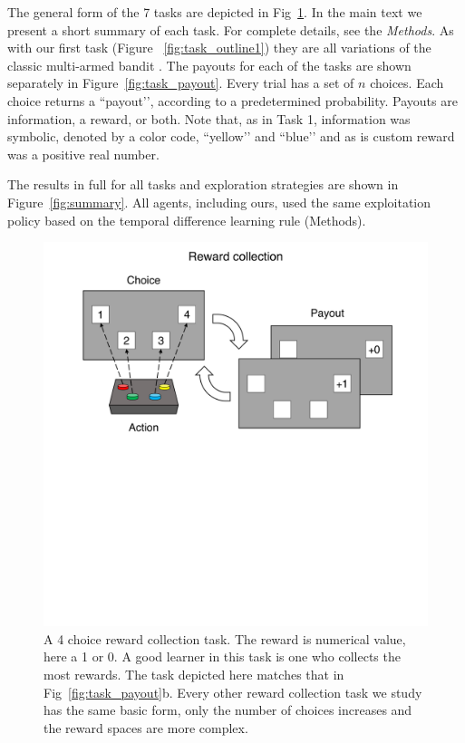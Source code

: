 The general form of the 7 tasks are depicted in Fig~\ref{fig:task_outline2}. In the main text we present a short summary of each task. For complete details, see the \emph{Methods}. As with our first task (Figure ~\ref{fig:task_outline1}) they are all variations of the classic multi-armed bandit \cite{Sutton2018}. The payouts for each of the tasks are shown separately in Figure~\ref{fig:task_payout}. Every trial has a set of $n$ choices. Each choice returns a ``payout’’, according to a predetermined probability. Payouts are information, a reward, or both. Note that, as in Task 1, information was symbolic, denoted by a color code, ``yellow’’ and ``blue’’ and as is custom reward was a positive real number. 

The results in full for all tasks and exploration strategies are shown in Figure~\ref{fig:summary}. All agents, including ours, used the same exploitation policy based on the temporal difference learning rule \cite{Sutton2018} (Methods).

\begin{figure}
	\includegraphics[width=0.7\linewidth]{img/task_outline2.pdf} 
	\caption{A 4 choice reward collection task. The reward is numerical value, here a 1 or 0. A good learner in this task is one who collects the most rewards. The task depicted here matches that in Fig~\ref{fig:task_payout}b. Every other reward collection task we study has the same basic form, only the number of choices increases and the reward spaces are more complex.}
	\label{fig:task_outline2} 
\end{figure}

